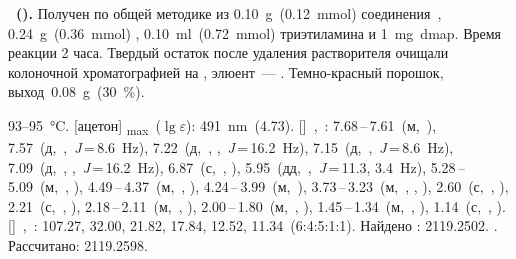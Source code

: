\textbf{~().} 
Получен по общей методике из \SI{0.10}{\gram}~(\SI{0.12}{\milli\mole}) соединения~, \SI{0.24}{\gram}~(\SI{0.36}{\milli\mole}) , \SI{0.10}{\milli\litre}~(\SI{0.72}{\milli\mole}) триэтиламина и \SI{1}{\milli\gram}~\ac{dmap}.
Время реакции 2 часа. Твердый остаток после удаления растворителя очищали колоночной хроматографией на , элюент~--- .
Темно-красный порошок, выход~\SI{0.08}{\gram}~(\SI{30}{\percent}).
\begin{experimental}
     93--\SI{95}{\celsius}.
    [ацетон] \chemlambda\textsubscript{max}~($\lg \varepsilon$): \SI{491}{\nano\metre}~(4.73).
    []~\chemdelta,~\si{\ppm}: 7.68\,--\,7.61~(м,~), 7.57~(д,~,~\textit{J}\,=\,8.6~\si{\hertz}), 7.22~(д,~, ,~\textit{J}\,=\,16.2~\si{\hertz}), 7.15~(д,~,~\textit{J}\,=\,8.6~\si{\hertz}), 7.09~(д,~, ,~\textit{J}\,=\,16.2~\si{\hertz}), 6.87~(с,~, ), 5.95~(дд,~,~\textit{J}\,=\,11.3, 3.4~\si{\hertz}), 5.28\,--\,5.09~(м,~, ), 4.49\,--\,4.37~(м,~, ), 4.24\,--\,3.99~(м,~), 3.73\,--\,3.23~(м,~, , ), 2.60~(с,~, ), 2.21~(с,~, ), 2.18\,--\,2.11~(м,~, ), 2.00\,--\,1.80~(м,~, ), 1.45\,--\,1.34~(м,~, ), 1.14~(с,~, ).
    []~\chemdelta,~\si{\ppm}: 107.27, 32.00, 21.82, 17.84, 12.52, 11.34~(6:4:5:1:1).
     Найдено \ce{[M - H]-}: \num{2119.2502}. . Рассчитано: \ce{[M - H]} \num{2119.2598}.
\end{experimental}

